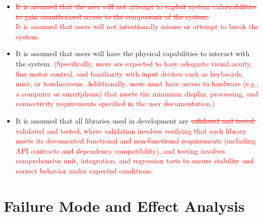 \documentclass{article}
\begin{document}
\begin{itemize}
    \item \textcolor{red}{\sout{It is assumed that the user will not attempt to exploit system vulnerabilities to gain unauthorized access to the components of the system.}} \\
    \textcolor{red}{It is assumed that users will not intentionally misuse or attempt to break the system.}
    \item It is assumed that users will have the physical capabilities to interact with the system. \textcolor{red}{(Specifically, users are expected to have adequate visual acuity, fine motor control, and familiarity with input devices such as keyboards, mice, or touchscreens. Additionally, users must have access to hardware (e.g., a computer or smartphone) that meets the minimum display, processing, and connectivity requirements specified in the user documentation.)}
    \item It is assumed that all libraries used in development are \textcolor{red}{\sout{validated and tested.}} \textcolor{red}{validated and tested, where validation involves verifying that each library meets its documented functional and non-functional requirements (including API contracts and dependency compatibility), and testing involves comprehensive unit, integration, and regression tests to ensure stability and correct behavior under expected conditions.}
\end{itemize}

\section{Failure Mode and Effect Analysis}
\end{document}
